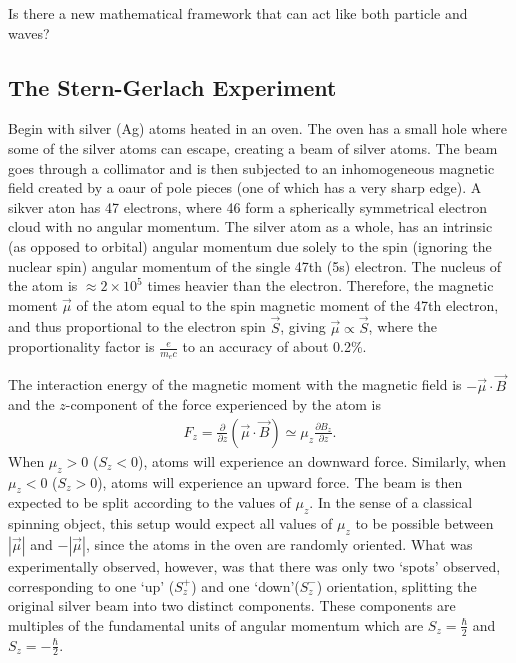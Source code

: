 \begin{questions}
	\item Is there a new mathematical framework that can act like both particle and waves?
\end{questions}




\subsection{The Stern-Gerlach Experiment}

Begin with silver (Ag) atoms heated in an oven. The oven has a small hole where some of the silver atoms can escape, creating a beam of silver atoms. The beam goes through a collimator and is then subjected to an inhomogeneous magnetic field created by a oaur of pole pieces (one of which has a very sharp edge). A sikver aton has 47 electrons, where 46 form a spherically symmetrical electron cloud with no angular momentum. The silver atom as a whole, has an intrinsic (as opposed to orbital) angular momentum due solely to the spin (ignoring the nuclear spin) angular momentum of the single 47th (5s) electron. The nucleus of the atom is $\approx 2 \times 10^5$ times heavier than the electron. Therefore, the magnetic moment $\vec{\mu}$ of the atom equal to the spin magnetic moment of the 47th electron, and thus proportional to the electron spin $\vec{S}$, giving $\vec{\mu} \propto \vec{S}$, where the proportionality factor is $\frac{e}{m_ec}$ to an accuracy of about 0.2\%\cite{bib:Modern Quantum Mechanics J.J Sakurai}.

The interaction energy of the magnetic moment with the magnetic field is $-\vec{\mu}\cdot\vec{B}$ and the $z$-component of the force experienced by the atom is 
\begin{align}
F_z = \frac{\partial}{\partial z}(\vec{\mu}\cdot \vec{B}) \simeq \mu_z \frac{\partial B_z}{\partial z}.
\end{align}
When $\mu_z > 0$ ($S_z < 0$), atoms will experience an downward force. Similarly, when $\mu_z < 0$ ($S_z > 0$), atoms will experience an upward force. The beam is then expected to be split according to the values of $\mu_z$. In the sense of a classical spinning object, this setup would expect all values of $\mu_z$ to be possible between $|\vec{\mu}|$ and $-|\vec{\mu}|$, since the atoms in the oven are randomly oriented. What was experimentally observed, however, was that there was only two `spots' observed, corresponding to one `up' ($S_z^+$) and one `down'($S_z^-$) orientation, splitting the original silver beam into two distinct components. These components are multiples of the fundamental units of angular momentum which are $S_z=\frac{\hbar}{2}$ and $S_z=-\frac{\hbar}{2}$.

